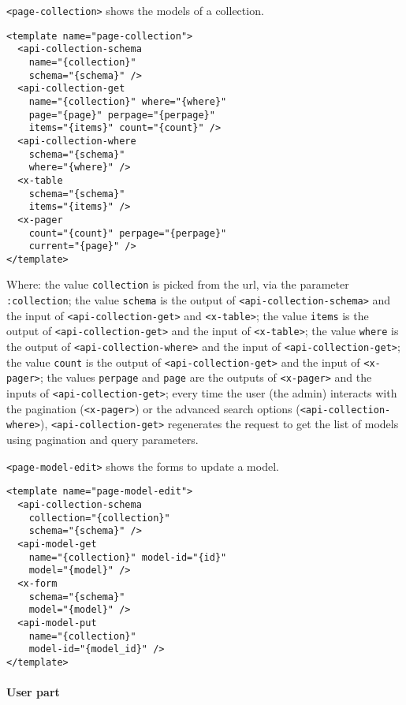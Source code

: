 \vspace{0.2cm}

\texttt{<page-collection>} shows the models of a collection.

\begin{lstlisting}[language=HTML5]
<template name="page-collection">
  <api-collection-schema
    name="{collection}"
    schema="{schema}" />
  <api-collection-get 
    name="{collection}" where="{where}" 
    page="{page}" perpage="{perpage}"  
    items="{items}" count="{count}" />
  <api-collection-where 
    schema="{schema}"
    where="{where}" />
  <x-table 
    schema="{schema}"
    items="{items}" />
  <x-pager 
    count="{count}" perpage="{perpage}"
    current="{page}" />
</template>
\end{lstlisting}

Where: 
the value \texttt{collection} is picked from the url, via the parameter \texttt{:collection};
the value \texttt{schema} is the output of \texttt{<api-collection-schema>} and the input of \texttt{<api-collection-get>} and \texttt{<x-table>};
the value \texttt{items} is the output of \texttt{<api-collection-get>} and the input of \texttt{<x-table>};
the value \texttt{where} is the output of \texttt{<api-collection-where>} and the input of \texttt{<api-collection-get>};
the value \texttt{count} is the output of \texttt{<api-collection-get>} and the input of \texttt{<x-pager>};
the values \texttt{perpage} and \texttt{page} are the outputs of \texttt{<x-pager>} and the inputs of \texttt{<api-collection-get>};
every time the user (the admin) interacts with the pagination (\texttt{<x-pager>}) or the advanced search options (\texttt{<api-collection-where>}), \texttt{<api-collection-get>} regenerates the request to get the list of models using pagination and query parameters.

\vspace{0.2cm}

\texttt{<page-model-edit>} shows the forms to update a model.

\begin{lstlisting}[language=HTML5]
<template name="page-model-edit">
  <api-collection-schema
    collection="{collection}"
    schema="{schema}" />
  <api-model-get 
    name="{collection}" model-id="{id}"
    model="{model}" />
  <x-form 
    schema="{schema}" 
    model="{model}" />
  <api-model-put 
    name="{collection}"
    model-id="{model_id}" />
</template>
\end{lstlisting}

\paragraph{User part}

